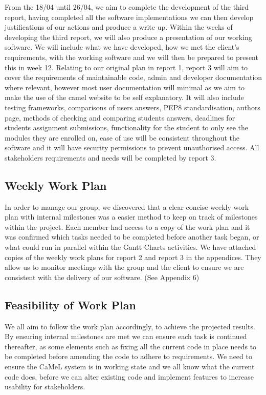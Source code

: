 From the 18/04 until 26/04, we aim to complete the development of the third report, having completed all the software implementations we can then develop justifications of our actions and produce a write up. Within the weeks of developing the third report, we will also produce a presentation of our working software. We will include what we have developed, how we met the client's requirements, with the working software and we will then be prepared to present this in week 12. Relating to our original plan in report 1, report 3 will aim to cover the requirements of maintainable code, admin and developer documentation where relevant, however most user documentation will minimal as we aim to make the use of the camel website to be self explanatory. It will also include testing frameworks, comparisons of users answers, PEP8 standardisation, authors page, methods of checking and comparing students answers, deadlines for students assignment submissions, functionality for the student to only see the modules they are enrolled on, ease of use will be consistent throughout the software and it will have security permissions to prevent unauthorised access. All stakeholders requirements and needs will be completed by report 3.\\

\subsection*{Weekly Work Plan}

In order to manage our group, we discovered that a clear concise weekly work plan with internal milestones was a easier method to keep on track of milestones within the project. Each member had access to a copy of the work plan and it was confirmed which tasks needed to be completed before another task began, or what could run in parallel within the Gantt Charts activities. We have attached copies of the weekly work plans for report 2 and report 3 in the appendices. They allow us to monitor meetings with the group and the client to ensure we are consistent with the delivery of our software. (See Appendix 6)\\

\subsection*{Feasibility of Work Plan}

We all aim to follow the work plan accordingly, to achieve the projected results. By ensuring internal milestones are met we can ensure each task is continued thereafter, as some elements such as fixing all the current code in place needs to be completed before amending the code to adhere to requirements. We need to ensure the CaMeL system is in working state and we all know what the current code does, before we can alter existing code and implement features to increase usability for stakeholders.\\

